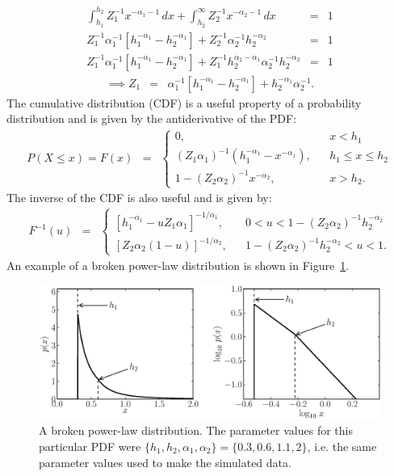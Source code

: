 \documentclass[12pt, preprint]{aastex}
\begin{document}
\begin{eqnarray}
\int_{h_1}^{h_2} Z_1^{-1} x^{-\alpha_1 - 1} \, dx
+
\int_{h_2}^\infty Z_2^{-1} x^{-\alpha_2 - 1} \, dx
&=& 1 \\
Z_1^{-1}\alpha_1^{-1}\left[h_1^{-\alpha_1} - h_2^{-\alpha_1}\right]
+
Z_2^{-1}\alpha_2^{-1}h_2^{-\alpha_2}
&=& 1 \\
Z_1^{-1}\alpha_1^{-1}\left[h_1^{-\alpha_1} - h_2^{-\alpha_1}\right]
+
Z_1^{-1}h_2^{\alpha_2-\alpha_1}\alpha_2^{-1}h_2^{-\alpha_2}
&=& 1
\end{eqnarray}
\begin{eqnarray}
\implies
Z_1 &=& \alpha_1^{-1}\left[h_1^{-\alpha_1} - h_2^{-\alpha_1}\right]
+
h_2^{-\alpha_1}\alpha_2^{-1}.
\end{eqnarray}
The cumulative distribution (CDF) is a useful property of a probability
distribution and is given by the antiderivative of the PDF:
\begin{eqnarray}
P(X \leq x) = F(x) &=&
\left\{
\begin{array}{lcr}
0, & & x < h_1 \\
(Z_1\alpha_1)^{-1}\left(h_1^{-\alpha_1} - x^{-\alpha_1}\right), & & h_1 \leq x \leq h_2 \\
1 - (Z_2\alpha_2)^{-1}x^{-\alpha_2}, & & x > h_2.
\end{array}
\right.
\end{eqnarray}
The inverse of the CDF is also useful and is given by:
\begin{eqnarray}
F^{-1}(u) &=&
\left\{
\begin{array}{lcr}
\left[h_1^{-\alpha_1} - uZ_1\alpha_1\right]^{-1/\alpha_1}, & & 0 < u < 1 - (Z_2\alpha_2)^{-1}h_2^{-\alpha_2}\\
\left[Z_2\alpha_2(1-u)\right]^{-1/\alpha_2},& & 1 - (Z_2\alpha_2)^{-1}h_2^{-\alpha_2}< u < 1.
\end{array}
\right.
\end{eqnarray}
An example of a broken power-law distribution is shown in Figure~\ref{fig:powerlaw}.
\begin{figure}[ht!]
\begin{center}
\includegraphics[width=\textwidth]{Figures/broken.eps}
\caption{A broken power-law distribution. The parameter values for this
particular PDF were
$\{h_1, h_2, \alpha_1, \alpha_2\} = \{0.3, 0.6, 1.1, 2\}$, i.e. the same
parameter values used to make the simulated data.
\label{fig:powerlaw}}
\end{center}
\end{figure}
\end{document}
